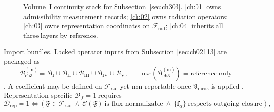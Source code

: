 \begin{figure}[t]
\centering
{}
\caption{Volume~I continuity stack for Subsection~\ref{sec:ch303}. \ref{ch:01} owns
admissibility measurement records; \ref{ch:02} owns radiation operators; \ref{ch:03}
owns representation coordinates on \(\mathcal{F}_{\mathrm{rad}}\); \ref{ch:04} inherits
all three layers by reference.}
\label{fig:ch3.volume-continuity-stack}
\end{figure}
Import bundles. Locked operator inputs from Subsection~\ref{sec:ch02113} are packaged as
\begin{equation}
\label{eq:ch3.import-bundle-lock}
\mathcal{B}_{\mathrm{ch3}}^{(\mathrm{in})}
=
\mathcal{B}_{\mathrm{I}}\cup\mathcal{B}_{\mathrm{II}}\cup\mathcal{B}_{\mathrm{III}}
\cup\mathcal{B}_{\mathrm{IV}}\cup\mathcal{B}_{\mathrm{V}},
\qquad
\text{use}(\mathcal{B}_{\mathrm{ch3}}^{(\mathrm{in})})
=
\text{reference-only}.
\end{equation}
\cite{stratton1941}. A coefficient may be defined on \(\mathcal{F}_{\mathrm{rad}}\) yet
non-reportable once \(\mathfrak{A}_{\mathrm{meas}}\) is applied \cite{harrington2001}.
Representation-specific $\mathcal{D}_J=1$ requires
\begin{equation}
\label{eq:ch3.representation-admissibility}
\mathcal{D}_{\mathrm{rep}}=1
\iff
\left(
\mathfrak{F}\in\mathcal{F}_{\mathrm{rad}}\
\wedge\
\mathcal{C}(\mathfrak{F})\ \text{is flux-normalizable}\
\wedge\
\{\mathbf{f}_\alpha\}\ \text{respects outgoing closure}
\right),
\end{equation}
